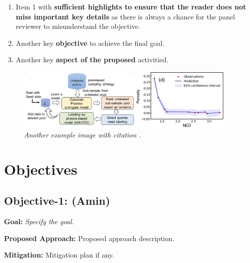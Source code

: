 \documentclass[11pt]{article}
\begin{document}
\vspace{-10pt}
\begin{enumerate}[label=\textbf{Objective-\arabic*:}, align=left, labelwidth=4em, labelsep=1em, leftmargin=*,noitemsep]
    \item Item 1 with \textbf{sufficient highlights to ensure that the reader does not miss important key details} as there is always a chance for the panel reviewer to misunderstand the objective.
    \item Another key \textbf{objective} to achieve the final goal.
    \item Another key \textbf{aspect of the proposed} activitied.
\end{enumerate}

\begin{figure}[htbp]
	\centering
	\includegraphics[width=0.95\textwidth]{./figures/ActiveLearning.png} %
    \vspace{-13pt}  %
    \caption{\emph{Another example image with citation \cite{mojumderLinkingProcessParameters2023}.}}
	\label{fig:active-learning}
    \vspace{-20pt}  %
\end{figure}
%
\section{Objectives}
\label{sec:objectives}
\subsection{Objective-1: (Amin)}
\label{sec:object1}


\noindent
\textbf{\textcolor{FlyersRed}{{Goal:}}}
\textit{Specify the goal.}



\noindent
\textbf{\textcolor{FlyersRed}{{Proposed Approach:}}}
Proposed approach description.

\noindent
\textbf{\textcolor{FlyersRed}{{Mitigation:}}}
Mitigation plan if any.
\end{document}
